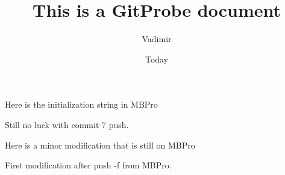 \documentclass[]{article}
\begin{document}
\title{This is a GitProbe document}
\author{Vadimir}
\date{Today}
\maketitle

Here is the initialization string in MBPro

Still no luck with commit 7 push. 

Here is a minor modification that is still on MBPro

First modification after push -f  from MBPro.
\end{document}

